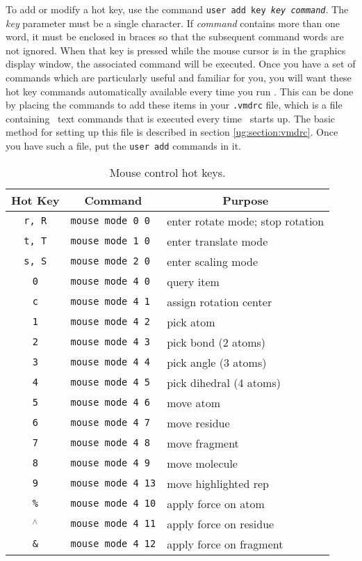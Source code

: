To add or modify a hot key, use the command
{\tt user add key {\it key} {\it command}}.
The {\em key} parameter must be a single character.  
If {\em command} contains more than one word, it must be enclosed in 
braces so that the subsequent command words are not ignored.  
When that key is pressed while the mouse cursor is in the 
graphics display window, the associated command will be executed.
Once you have a set of commands which are particularly
useful and familiar for you, you will want these
hot key commands automatically available every time you run \VMD.  
This can be done by placing the commands to add these items
in your {\tt .vmdrc} file, which is a file containing \VMD\ text
commands that is executed every time
\VMD\ starts up. 
The basic method for setting up this file is described
in section \ref{ug:section:vmdrc}.  
Once you have such a file, put the {\tt user add} commands in it.


\begin{table}[htb]
  \hspace{1in}
  \begin{tabular}{|c|l|l|} \hline
    Hot Key & \multicolumn{1}{|c}{Command} &
		\multicolumn{1}{|c|}{Purpose}\\ \hline\hline
	{\tt r, R}	& {\tt mouse mode 0 0} 	& enter rotate mode; stop rotation \\
	{\tt t, T}	& {\tt mouse mode 1 0} 	& enter translate mode \\
	{\tt s, S}	& {\tt mouse mode 2 0} 	& enter scaling mode \\
	{\tt 0}		& {\tt mouse mode 4 0}	& query item \\
	{\tt c}		& {\tt mouse mode 4 1}	& assign rotation center \\
	{\tt 1}		& {\tt mouse mode 4 2} 	& pick atom \\
	{\tt 2} 	& {\tt mouse mode 4 3}	& pick bond (2 atoms) \\
	{\tt 3}		& {\tt mouse mode 4 4}	& pick angle (3 atoms) \\
	{\tt 4}		& {\tt mouse mode 4 5} 	& pick dihedral (4 atoms) \\
	{\tt 5}		& {\tt mouse mode 4 6}	& move atom \\
	{\tt 6}		& {\tt mouse mode 4 7} 	& move residue \\
	{\tt 7}		& {\tt mouse mode 4 8} 	& move fragment \\
	{\tt 8}		& {\tt mouse mode 4 9}	& move molecule \\
	{\tt 9}		& {\tt mouse mode 4 13}	& move highlighted rep \\
	{\tt \%}	& {\tt mouse mode 4 10} & apply force on atom \\
	{\tt ${}^\wedge$}	& {\tt mouse mode 4 11}	& apply force on residue \\
	{\tt \&}	& {\tt mouse mode 4 12} & apply force on fragment \\ \hline
  \end{tabular}
  \caption{Mouse control hot keys.}
  \label{table:ug:mouse:control}
\end{table}


